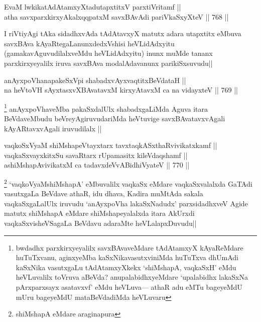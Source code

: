\begin{shl}
EvaM lwkikatAdAtamxyXtadutapxtitxV parxtiVritamf || \\
atha savxparxkirxyAkalxqqpatxM savxBAvAdi pariVkaSxyXteV ||  768 ||  
\end{shl}

\begin{artha}
I riVtiyAgi tAka sidadhxvAda tAdAtavxyX matutx adara utapxtitx eMbuva savxBAva kAyaRtegaLanunxdedxVshisi heVLidAdxyitu (gamakavAguvudilalxveMdu heVLidAdxyitu) inunx muMde tananx parxkirxyeyalilx iruva savxBAva modalAdavanunx parikiSxsuvudu||
\end{artha}


\begin{shl}
anAyxpoVhanapakeSxV\s pi shabadxvAyxvaqtitxBeVdataH || \\
na heVtoVH sAyxtasxvXBAvatavxM kirxyAtavxM ca na vidayxteV ||  769 ||  
\end{shl}

\begin{artha}
\footnote{bwdadhx parxkirxyeyalilx savxBAvaveMdare tAdAtamxyX kAyaReMdare huTuTxvanu, aginxyeMba kaSxNikavasutxviniMda huTuTxva dhUmAdi kaSxNika vasutxgaLu tAdAtamxyXkekx `shiMshapA, vaqkaSxH' eMdu heVLuvalilx toVruva aBeVda? anupalabidhxyeMdare `upalabidhx lakaSxNa pArxparxsayx asatavxvf' eMdu heVLuva--- athaR adu eMTu bageyeMdU mUru bageyeMdU mataBeVdadiMda heVLuvaru}
anAyxpoVhaveMba pakaSxdalUlx shabadxgaLiMda Aguva itara BeVdaveMbudu beVreyAgiruvudariMda heVtuvige savxBAvatavxvAgali kAyARtavxvAgali iruvudilalx ||
\end{artha}


\begin{shl}
vaqkoSxV\s yaM shiMshapeVtayxtarx tavxtaqkASxthaRvivikatxkamf || \\
vaqkaSxvayxkitxSu savaRtarx rUpamasitx kileVdaqshamf || \\
ashiMshapAvivikatxM ca tadavxdeVvABidhiVyateV ||  770 ||  
\end{shl}

\begin{artha}
\footnote{shiMshapA eMdare araginapura}
`vaqkoV\s yaMshiMshapA' eMbuvalilx vaqkaSx eMdare vaqkaSxvalalxda GaTAdi vasutxgaLa BeVdave athaR, idu dhava, Kadira muMtAda sakala vaqkaSxgaLalUlx iruvudu `anAyxpoVha lakaSxNadudx' parxsidadhxveV Agide matutx shiMshapA eMdare shiMshapeyalalxda itara AkUrxdi vaqkaSxvisheVSagaLa BeVdavu adaraMte heVLalapxDuvudu||
\end{artha}

